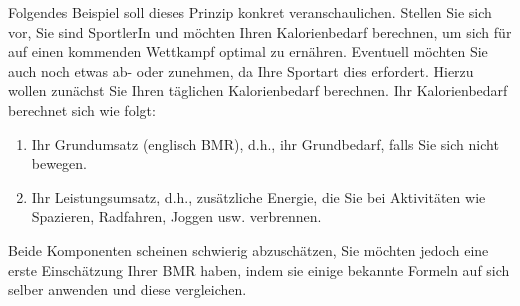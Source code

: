 Folgendes Beispiel soll dieses Prinzip konkret veranschaulichen. Stellen Sie sich vor, Sie sind SportlerIn und möchten Ihren Kalorienbedarf berechnen, um sich für auf einen kommenden Wettkampf optimal zu ernähren. Eventuell möchten Sie auch noch etwas ab- oder zunehmen, da Ihre Sportart dies erfordert. Hierzu wollen zunächst Sie Ihren täglichen Kalorienbedarf berechnen. Ihr Kalorienbedarf berechnet sich wie folgt:
\begin{enumerate}
\item Ihr Grundumsatz (englisch \gls{BMR}), d.h., ihr Grundbedarf, falls Sie sich nicht bewegen.
\item Ihr Leistungsumsatz, d.h., zusätzliche Energie, die Sie bei Aktivitäten wie Spazieren, Radfahren, Joggen usw. verbrennen.
\end{enumerate}

Beide Komponenten scheinen schwierig abzuschätzen, Sie möchten jedoch eine erste Einschätzung Ihrer \gls{BMR} haben, indem sie einige bekannte Formeln auf sich selber anwenden und diese vergleichen.

